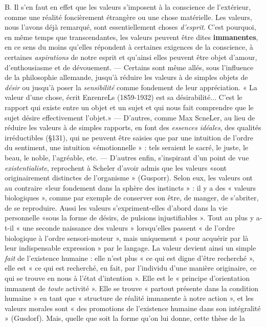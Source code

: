 B. Il s’en faut en effet que les valeurs s'imposent à la conscience
de l'extérieur, comme une réalité foncièrement étrangère ou une chose
matérielle. Les valeurs, nous l'avons déjà remarqué, sont essentiellement
choses {\it d'esprit}. C’est pourquoi, en même temps que transcendantes,
les valeurs peuvent être dites {\bf immanentes}, en ce sens du
moins qu’elles répondent à certaines exigences de la conscience, à
certaines {\it aspirations} de notre esprit et qu’ainsi elles peuvent être
objet d'amour, d'enthousiasme et de dévouement. — Certains sont
même allés, sous l'influence de la philosophie allemande, jusqu’à
réduire les valeurs à de simples objets de {\it désir} ou jusqu’à poser la {\it sensibilité}
comme fondement de leur appréciation. « La valeur d’une chose,
écrit EnrenreLs (1859-1932) est sa désirabilité... C'est le rapport qui
existe entre un objet et un sujet et qui nous fait comprendre que
le sujet désire effectivement l’objet.» — D'autres, comme Max
ScneLer, au lieu de réduire les valeurs à de simples rapports, en
font des {\it essences idéales}, des qualités irréductibles (\S 131), qui ne
peuvent être saisies que par une intuition de l’ordre du sentiment,
une intuition «émotionnelle » : tels seraient le sacré, le juste, le
beau, le noble, l’agréable, etc. — D’autres enfin, s'inspirant d'un
point de vue {\it existentialiste}, reprochent à Scheler d’avoir admis que
les valeurs «sont originairement distinctes de l'organisme » (Gusporr).
Selon eux, les valeurs ont au contraire «leur fondement
dans la sphère des instincts » : il y a des « valeurs biologiques », comme
par exemple de conserver son être, de manger, de s’abriter, de se
reproduire. Aussi les valeurs s’expriment-elles d’abord dans la vie
personnelle «sous la forme de désirs, de pulsions injustifiables ».
Tout au plus y a-t-il « une seconde naissance des valeurs » lorsqu'elles
passent « de l’ordre biologique à l’ordre sensori-moteur », mais uniquement
« pour acquérir par là leur indispensable expression » par
le langage. La valeur devient ainsi un simple {\it fait} de l'existence
humaine : elle n’est plus « ce qui est digne d’être recherché », elle est
« ce qui est recherché, en fait, par l’individu d’une manière originaire,
ce qui se trouve en nous à l’état d'intention ». Elle est le « principe
d'orientation immanent de {\it toute} activité ». Elle se trouve « partout
présente dans la condition humaine » en tant que « structure de réalité
immanente à notre action », et les valeurs morales sont « des promotions
de l'existence humaine dans son intégralité » (Gusdorf).
Mais, quelle que soit la forme qu’on lui donne, cette thèse de la
